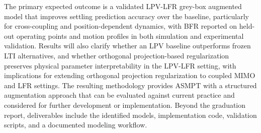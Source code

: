The primary expected outcome is a validated LPV-LFR grey-box augmented model that improves settling prediction accuracy over the baseline, particularly for cross-coupling and position-dependent dynamics, with BFR reported on held-out operating points and motion profiles in both simulation and experimental validation. Results will also clarify whether an LPV baseline outperforms frozen LTI alternatives, and whether orthogonal projection-based regularization preserves physical parameter interpretability in the LPV-LFR setting, with implications for extending orthogonal projection regularization to coupled MIMO and LFR settings. The resulting methodology provides ASMPT with a structured augmentation approach that can be evaluated against current practice and considered for further development or implementation. Beyond the graduation report, deliverables include the identified models, implementation code, validation scripts, and a documented modeling workflow.
